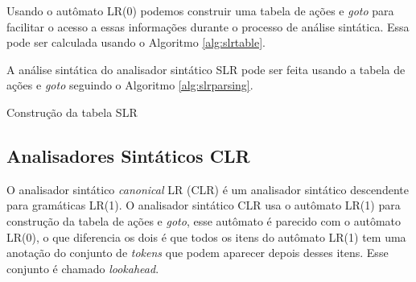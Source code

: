 Usando o autômato LR(0) podemos construir uma tabela de ações e \textit{goto} para facilitar o acesso a essas informações durante o processo de análise sintática. Essa pode ser calculada usando o Algoritmo \ref{alg:slrtable}.

A análise sintática do analisador sintático SLR pode ser feita usando a tabela de ações e \textit{goto} seguindo o Algoritmo \ref{alg:slrparsing}.
\begin{algorithm}[htp]
    \caption{Construção da tabela SLR}\label{alg:slrtable}
\end{algorithm}
{}


\subsection{Analisadores Sintáticos CLR}
O analisador sintático \textit{canonical} LR (CLR) é um analisador sintático descendente para gramáticas LR(1). O analisador sintático CLR usa o autômato LR(1) para construção da tabela de ações e \textit{goto}, esse autômato é parecido com o autômato LR(0), o que diferencia os dois é que todos os itens do autômato LR(1) tem uma anotação do conjunto de \textit{tokens} que podem aparecer depois desses itens. Esse conjunto é chamado \textit{lookahead}. 

